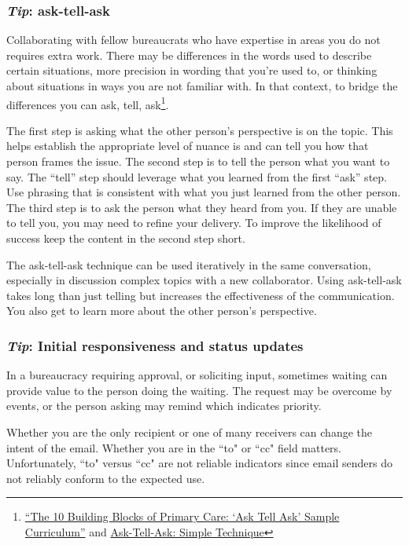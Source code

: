 \subsubsection*{\textit{Tip}: ask-tell-ask}

Collaborating with fellow bureaucrats who have expertise in areas you do not requires extra work. There may be differences in the words used to describe certain situations, more precision in wording that you're used to, or thinking about situations in ways you are not familiar with. In that context, to bridge the differences you can ask, tell, ask\footnote{\href{https://cepc.ucsf.edu/sites/cepc.ucsf.edu/files/Curriculum_sample_14-0602.pdf}{``The 10 Building Blocks of Primary Care: `Ask Tell Ask' Sample Curriculum''} and \href{https://www.the-hospitalist.org/hospitalist/article/125126/qi-initiatives/ask-tell-ask-simple-technique-can-help-hospitalists}{Ask-Tell-Ask: Simple Technique}}. 

The first step is asking what the other person's perspective is on the topic. This helps establish the appropriate level of nuance is and can tell you how that person frames the issue. The second step is to tell the person what you want to say. The ``tell'' step should leverage what you learned from the first ``ask'' step. Use phrasing that is consistent with what you just learned from the other person. The third step is to ask the person what they heard from you. If they are unable to tell you, you may need to refine your delivery. To improve the likelihood of success keep the content in the second step short. 

The ask-tell-ask technique can be used iteratively in the same conversation, especially in discussion complex topics with a new collaborator. Using ask-tell-ask takes long than just telling but increases the effectiveness of the communication. You also get to learn more about the other person's perspective. 


\subsubsection*{\textit{Tip}: Initial responsiveness and status updates}
In a bureaucracy requiring approval, or soliciting input, sometimes waiting can provide value to the person doing the waiting. The request may be overcome by events, or the person asking may remind which indicates priority.



Whether you are the only recipient or one of many receivers can change the intent of the email. Whether you are in the ``to" or ``cc" field matters. Unfortunately, ``to" versus ``cc" are not reliable indicators since email senders do not reliably conform to the expected use. 


